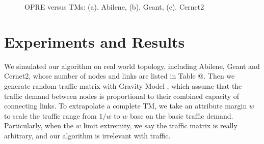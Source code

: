 \documentclass[conference]{IEEEtran}
\makeatletter
\newcommand{\Rmnum}[1]{\expandafter\@slowromancap\romannumeral #1@}
\makeatother
\begin{document}
\begin{figure}[!t]
\centering
\vspace*{0.1in}
\caption{OPRE versus TMs: (a). Abilene, (b). Geant, (c). Cernet2}
\vspace*{0.1in}
\end{figure}


\section{Experiments and Results}
We simulated our algorithm on real world topology, including Abilene, Geant and Cernet2, whose number of nodes and links are listed in Table \Rmnum{1}.
Then we generate random traffic matrix with Gravity Model \cite{networking:gravity}, which assume that the traffic demand between nodes is proportional
to their combined capacity of connecting links. To extrapolate a complete TM, we take an attribute margin $w$ to scale the traffic range from $1/w$ to $w$
base on the basic traffic demand. Particularly, when the $w$ limit extremity, we say the traffic matrix is really arbitrary, and our 
algorithm is irrelevant with traffic.
\end{document}
